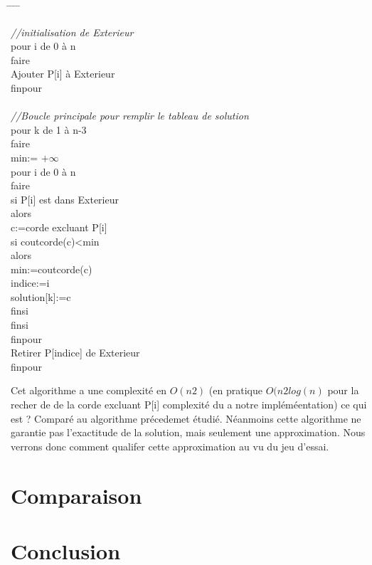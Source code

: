 \documentclass[a4paper,10pt]{article}
\begin{document}
\begin{tabbing}
\hspace{0.5cm} \= \hspace{0.5cm}  \= \hspace{0.5cm} \= \hspace{0.5cm} \= \kill


\textit{//initialisation de Exterieur}\\
pour i de 0 à n\\
faire\\
\> Ajouter P[i] à Exterieur\\
finpour\\
\\
\textit{//Boucle principale pour remplir le tableau de solution}\\
pour k de 1 à n-3\\
faire\\
    \> min:= $+\infty$ \\ 
    \> pour i de 0 à n\\
    \> faire\\
        \> \> si P[i] est dans Exterieur\\
        \> \> alors\\
            \> \> \> c:=corde excluant P[i]\\
            \> \> \> si coutcorde(c)<min\\
            \> \> \> alors\\
                \> \> \> \> min:=coutcorde(c)\\
                \> \> \> \> indice:=i\\
                \> \> \> \> solution[k]:=c\\
            \> \> \> finsi\\
        \> \> finsi\\
    \> finpour\\
    \> Retirer P[indice] de Exterieur\\
finpour\\
\end{tabbing}
 

Cet algorithme a une complexité en $O(n2)$ (en pratique $O(n2log(n)$ pour la recher de de la corde excluant P[i] complexité du a notre impléméentation) ce qui est ? Comparé au algorithme précedemet étudié.
Néanmoins cette algorithme ne garantie pas l'exactitude de la solution, mais seulement une approximation.
Nous verrons donc comment qualifer cette approximation au vu du jeu d'essai.


\section{Comparaison}

\section{Conclusion}
\end{document}
